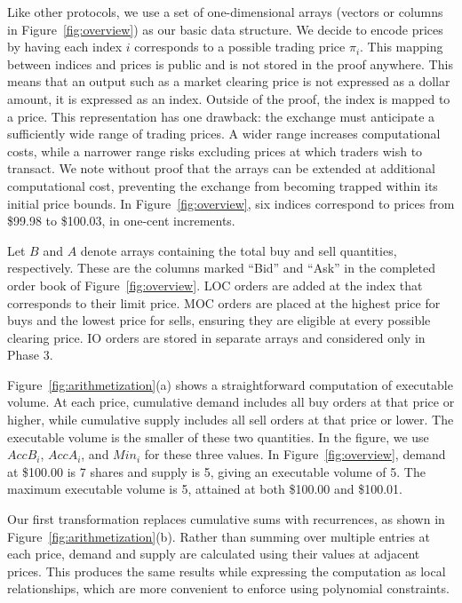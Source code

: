 Like other \ari protocols, we use a set of one-dimensional arrays (\aka vectors or columns in Figure~\ref{fig:overview}) as our basic data structure. We decide to encode prices by having each index $i$ corresponds to a possible trading price $\pi_i$. This mapping between indices and prices is public and is not stored in the proof anywhere. This means that an output such as a market clearing price is not expressed as a dollar amount, it is expressed as an index. Outside of the proof, the index is mapped to a price. This representation has one drawback: the exchange must anticipate a sufficiently wide range of trading prices. A wider range increases computational costs, while a narrower range risks excluding prices at which traders wish to transact. We note without proof that the arrays can be extended at additional computational cost, preventing the exchange from becoming trapped within its initial price bounds.  In Figure~\ref{fig:overview}, six indices correspond to prices from \$99.98 to \$100.03, in one-cent increments.

Let $B$ and $A$ denote arrays containing the total buy and sell quantities, respectively. These are the columns marked ``Bid'' and ``Ask'' in the completed order book of Figure~\ref{fig:overview}. LOC orders are added at the index that corresponds to their limit price. MOC orders are placed at the highest price for buys and the lowest price for sells, ensuring they are eligible at every possible clearing price. IO orders are stored in separate arrays and considered only in Phase 3.

Figure~\ref{fig:arithmetization}(a) shows a straightforward computation of executable volume. At each price, cumulative demand includes all buy orders at that price or higher, while cumulative supply includes all sell orders at that price or lower. The executable volume is the smaller of these two quantities. In the figure, we use $AccB_i$, $AccA_i$, and $Min_i$ for these three values. In Figure~\ref{fig:overview}, demand at \$100.00 is 7 shares and supply is 5, giving an executable volume of 5. The maximum executable volume is 5, attained at both \$100.00 and \$100.01.

Our first transformation replaces cumulative sums with recurrences, as shown in Figure~\ref{fig:arithmetization}(b). Rather than summing over multiple entries at each price, demand and supply are calculated using their values at adjacent prices. This produces the same results while expressing the computation as local relationships, which are more convenient to enforce using polynomial constraints.

